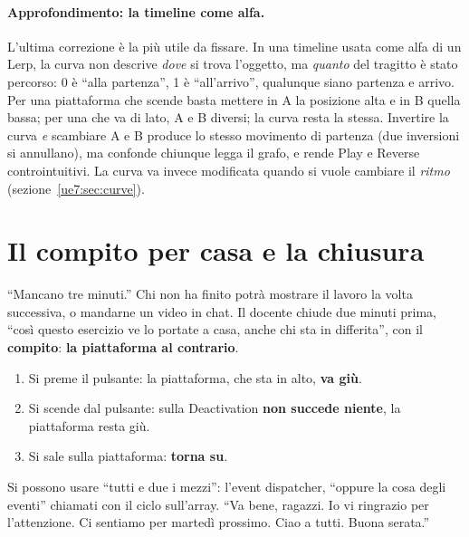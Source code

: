 \paragraph{Approfondimento: la timeline come alfa.} L'ultima correzione è la più utile da
fissare. In una timeline usata come alfa di un Lerp, la curva non descrive \emph{dove}
si trova l'oggetto, ma \emph{quanto} del tragitto è stato percorso: 0 è ``alla
partenza'', 1 è ``all'arrivo'', qualunque siano partenza e arrivo. Per una piattaforma che
scende basta mettere in A la posizione alta e in B quella bassa; per una che va di lato,
A e B diversi; la curva resta la stessa. Invertire la curva \emph{e} scambiare A e B
produce lo stesso movimento di partenza (due inversioni si annullano), ma confonde
chiunque legga il grafo, e rende Play e Reverse controintuitivi. La curva va invece
modificata quando si vuole cambiare il \emph{ritmo} (sezione~\ref{ue7:sec:curve}).

\section{Il compito per casa e la chiusura}
\label{ue7:sec:chiusura}

``Mancano tre minuti.'' Chi non ha finito potrà mostrare il lavoro la volta successiva,
o mandarne un video in chat. Il docente chiude due minuti prima, ``così questo esercizio
ve lo portate a casa, anche chi sta in differita'', con il \textbf{compito}: \textbf{la
piattaforma al contrario}.
\begin{enumerate}
  \item Si preme il pulsante: la piattaforma, che sta in alto, \textbf{va giù}.
  \item Si scende dal pulsante: sulla Deactivation \textbf{non succede niente}, la
        piattaforma resta giù.
  \item Si sale sulla piattaforma: \textbf{torna su}.
\end{enumerate}
Si possono usare ``tutti e due i mezzi'': l'event dispatcher, ``oppure la cosa degli
eventi'' chiamati con il ciclo sull'array. ``Va bene, ragazzi. Io vi ringrazio per
l'attenzione. Ci sentiamo per martedì prossimo. Ciao a tutti. Buona serata.''

